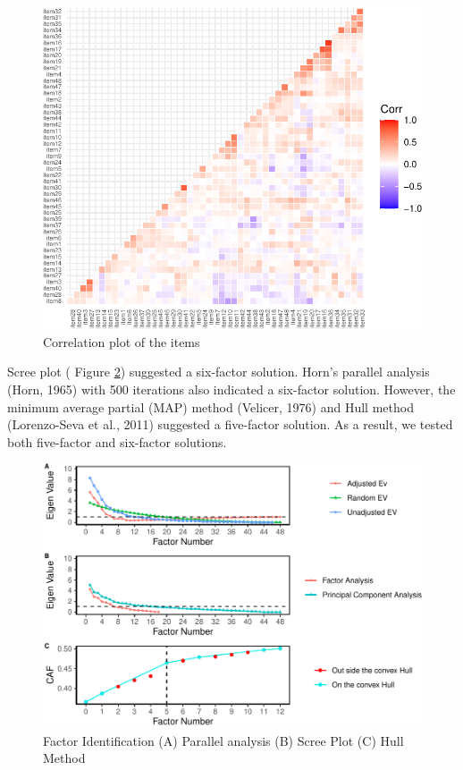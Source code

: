 \documentclass[
  english,
  man]{apa6}
\begin{document}
\begin{figure}

{\centering \includegraphics[width=1\linewidth]{manuscript_files/figure-latex/figCor-1} 

}

\caption{Correlation plot of the items}\label{fig:figCor}
\end{figure}

Scree plot ( Figure \ref{fig:facIdFig}) suggested a six-factor solution. Horn's parallel analysis (Horn, 1965) with 500 iterations also indicated a six-factor solution. However, the minimum average partial (MAP) method (Velicer, 1976) and Hull method (Lorenzo-Seva et al., 2011) suggested a five-factor solution. As a result, we tested both five-factor and six-factor solutions.

\begin{figure}

{\centering \includegraphics[width=1\linewidth,height=2\textheight]{manuscript_files/figure-latex/facIdFig-1} 

}

\caption{Factor Identification (A) Parallel analysis (B) Scree Plot (C) Hull Method}\label{fig:facIdFig}
\end{figure}
\end{document}
